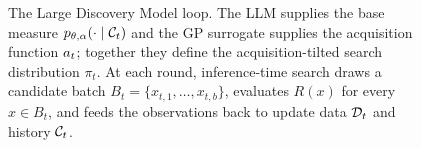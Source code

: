 \begin{figure}[t]
{%
}
\endgroup
\caption{The Large Discovery Model loop. The LLM supplies the base measure
$p_{\theta,\alpha}(\cdot\mid\mathcal{C}_t)$ and the GP surrogate supplies the acquisition function
$a_t$; together they define the acquisition-tilted search distribution $\pi_t$. At each
round, inference-time search draws a candidate batch $B_t=\{x_{t,1},\dots,x_{t,b}\}$,
evaluates $R(x)$ for every $x\in B_t$, and feeds the observations back to update data $\mathcal{D}_t$
and history $\mathcal{C}_t$.}
\label{fig:loop}
\end{figure}